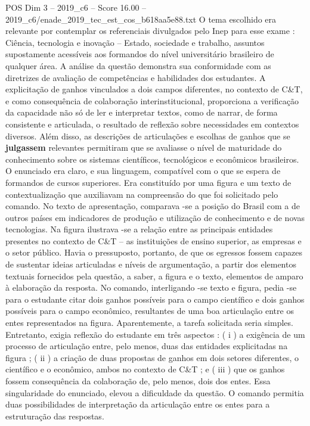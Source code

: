 \begin{textsample}{POS Dim 3 – 2019\_c6 – Score 16.00 – 2019\_c6/enade\_2019\_tec\_est\_cos\_b618aa5e88.txt}
O tema escolhido era relevante por contemplar os referenciais divulgados pelo Inep para esse exame : Ciência, tecnologia e inovação – Estado, sociedade e trabalho, assuntos supostamente acessíveis aos formandos do nível universitário brasileiro de qualquer área.
A análise da questão demonstra sua conformidade com as diretrizes de avaliação de competências e habilidades dos estudantes.
A explicitação de ganhos vinculados a dois campos diferentes, no contexto de C\&T, e como consequência de colaboração interinstitucional, proporciona a verificação da capacidade não só de ler e interpretar textos, como de narrar, de forma consistente e articulada, o resultado de reflexão sobre necessidades em contextos diversos.
Além disso, as descrições de articulações e escolhas de ganhos que se \textbf{julgassem} relevantes permitiram que se avaliasse o nível de maturidade do conhecimento sobre os sistemas científicos, tecnológicos e econômicos brasileiros.
O enunciado era claro, e sua linguagem, compatível com o que se espera de formandos de cursos superiores.
Era constituído por uma figura e um texto de contextualização que auxiliavam na compreensão do que foi solicitado pelo comando.
No texto de apresentação, comparava -se a posição do Brasil com a de outros países em indicadores de produção e utilização de conhecimento e de novas tecnologias.
Na figura ilustrava -se a relação entre as principais entidades presentes no contexto de C\&T – as instituições de ensino superior, as empresas e o setor público.
Havia o pressuposto, portanto, de que os egressos fossem capazes de sustentar ideias articuladas e níveis de argumentação, a partir dos elementos textuais fornecidos pela questão, a saber, a figura e o texto, elementos de amparo à elaboração da resposta.
No comando, interligando -se texto e figura, pedia -se para o estudante citar dois ganhos possíveis para o campo científico e dois ganhos possíveis para o campo econômico, resultantes de uma boa articulação entre os entes representados na figura.
Aparentemente, a tarefa solicitada seria simples.
Entretanto, exigia reflexão do estudante em três aspectos : ( i ) a exigência de um processo de articulação entre, pelo menos, duas das entidades explicitadas na figura ; ( ii ) a criação de duas propostas de ganhos em dois setores diferentes, o científico e o econômico, ambos no contexto de C\&T ; e ( iii ) que os ganhos fossem consequência da colaboração de, pelo menos, dois dos entes.
Essa singularidade do enunciado, elevou a dificuldade da questão.
O comando permitia duas possibilidades de interpretação da articulação entre os entes para a estruturação das respostas.

\end{textsample}
